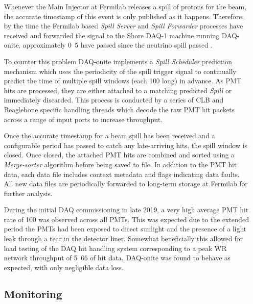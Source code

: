 Whenever the Main Injector at Fermilab releases a spill of protons for the \numi beam, the
accurate timestamp of this event is only published as it happens. Therefore, by the time the
Fermilab based \emph{Spill Server} and \emph{Spill Forwarder} processes have received and
forwarded the signal to the Shore DAQ-1 machine running DAQ-onite, approximately
\unit{0.5}{} have passed since the neutrino spill passed \chipsfive.

To counter this problem DAQ-onite implements a \emph{Spill Scheduler} prediction mechanism which
uses the periodicity of the spill trigger signal to continually predict the time of multiple spill
windows (each \unit{100}{} long) in advance. As PMT hits are processed, they are either
attached to a matching predicted \emph{Spill} or immediately discarded. This process is conducted
by a series of CLB and Beaglebone specific handling threads which decode the raw PMT hit packets
across a range of input ports to increase throughput. 

Once the accurate timestamp for a beam spill has been received and a configurable period has
passed to catch any late-arriving hits, the spill window is closed. Once closed, the attached PMT
hits are combined and sorted using a \emph{Merge-sorter} algorithm before being saved to file. In
addition to the PMT hit data, each data file includes context metadata and flags indicating data
faults. All new data files are periodically forwarded to long-term storage at Fermilab for further
analysis. 

During the initial \chipsfive DAQ commissioning in late 2019, a very high average PMT hit rate of
\unit{100}{} was observed across all PMTs. This was expected due to the extended period
the PMTs had been exposed to direct sunlight and the presence of a light leak through a tear in
the detector liner. Somewhat beneficially this allowed for load testing of the DAQ hit handling
system corresponding to a peak WR network throughput of \unit{5.66}{} of hit
data. DAQ-onite was found to behave as expected, with only negligible data loss.

\subsection{Monitoring} %
\label{sec:daq_soft_monitor} %

